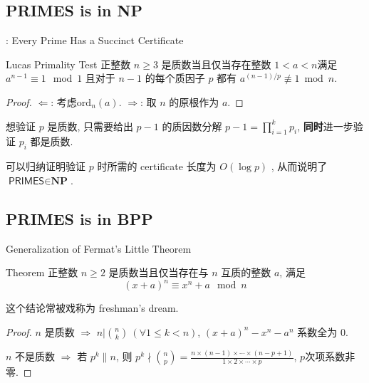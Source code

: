 \documentclass{beamer}
\def\le{\leqslant}
\def\ge{\geqslant}
\def\ord{\textrm{ord}}
\begin{document}
\subsection{PRIMES is in NP}
\begin{frame}{\cite{Pratt75}: Every Prime Has a Succinct Certificate}
	\begin{block}{Lucas Primality Test}
		正整数 $n \ge 3$ 是质数当且仅当存在整数 $1 < a < n$满足 $a^{n-1} \equiv 1 \mod 1$ 且对于 $n-1$ 的每个质因子 $p$ 都有 $a^{(n-1)/p} \not\equiv 1 \bmod n$.
	\end{block}
	\begin{proof}
		$\Leftarrow$: 考虑$\ord_{n}(a)$. $\Rightarrow$: 取 $n$ 的原根作为 $a$.
	\end{proof}
	
	想验证 $p$ 是质数, 只需要给出 $p - 1$ 的质因数分解 $p - 1 = \prod\limits_{i=1}^{k}p_i$, \textbf{同时}进一步验证 $p_i$ 都是质数.  

	可以归纳证明验证 $p$ 时所需的 certificate 长度为 $O(\log p)$ , 从而说明了 $\textsf{PRIMES} \in \textbf{NP}$.	
	
\end{frame}

\subsection{PRIMES is in BPP}
\begin{frame}{Generalization of Fermat's Little Theorem}
	\begin{block}{Theorem}
		正整数 $n \ge 2$ 是质数当且仅当存在与 $n$ 互质的整数 $a$, 满足 $$(x + a)^n \equiv x^n + a \mod n$$
	\end{block}

	这个结论常被戏称为 freshman's dream.

	\begin{proof}
		$n$ 是质数 $\Rightarrow$ $n | \binom{n}{k} \ (\forall 1 \le k < n)$, $(x + a)^n - x^n - a^n$ 系数全为 $0$.

		$n$ 不是质数 $\Rightarrow$ 若 $p^k \| n$, 则 $p^k \nmid \binom{n}{p} = \frac{n \times (n-1) \times \cdots \times (n-p+1)}{1 \times 2 \times \cdots \times p}$, $p$次项系数非零.
	\end{proof}
	
\end{frame}
\end{document}
